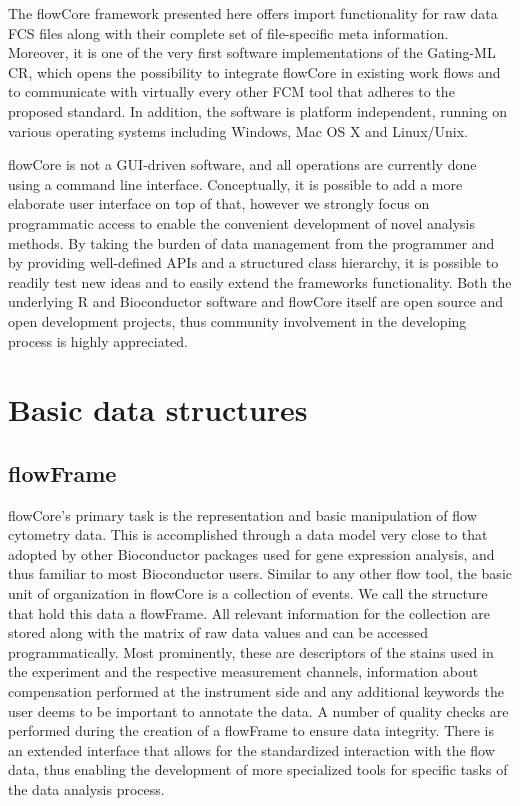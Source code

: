 \documentclass[12pt]{article}
\begin{document}
The flowCore framework presented here offers import functionality for
raw data FCS files along with their complete set of file-specific meta
information.  Moreover, it is one of the very first software
implementations of the Gating-ML CR, which opens the possibility to
integrate flowCore in existing work flows and to communicate with
virtually every other FCM tool that adheres to the proposed
standard. In addition, the software is platform independent, running
on various operating systems including Windows, Mac OS X and
Linux/Unix.

flowCore is not a GUI-driven software, and all operations are
currently done using a command line interface. Conceptually, it is
possible to add a more elaborate user interface on top of that,
however we strongly focus on programmatic access to enable the
convenient development of novel analysis methods. By taking the burden
of data management from the programmer and by providing well-defined
APIs and a structured class hierarchy, it is possible to readily test
new ideas and to easily extend the frameworks functionality. Both the
underlying R and Bioconductor software and flowCore itself are open
source and open development projects, thus community involvement in the
developing process is highly appreciated.



\section*{Basic data structures}
\subsection*{flowFrame}
flowCore's primary task is the representation and basic manipulation
of flow cytometry data. This is accomplished through a data model very
close to that adopted by other Bioconductor packages used for gene
expression analysis, and thus familiar to most Bioconductor
users. Similar to any other flow tool, the basic unit of organization
in flowCore is a collection of events. We call the structure that hold
this data a flowFrame. All relevant information for the collection are
stored along with the matrix of raw data values and can be accessed
programmatically. Most prominently, these are descriptors of the
stains used in the experiment and the respective measurement channels,
information about compensation performed at the instrument side and
any additional keywords the user deems to be important to annotate the
data. A number of quality checks are performed during the creation of
a flowFrame to ensure data integrity. There is an extended interface
that allows for the standardized interaction with the flow data, thus
enabling the development of more specialized tools for specific tasks
of the data analysis process.
\end{document}
